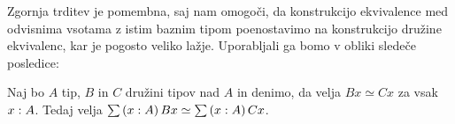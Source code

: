 Zgornja trditev je pomembna, saj nam omogoči, da konstrukcijo ekvivalence med odvisnima
vsotama z istim baznim tipom poenostavimo na konstrukcijo družine ekvivalenc,
kar je pogosto veliko lažje. Uporabljali ga bomo v obliki sledeče posledice:

\begin{posledica}
  \label{equiv-tot}
  Naj bo \(A\) tip, \(B\) in \(C\) družini tipov nad \(A\) in denimo, da velja
  \(Bx \simeq Cx\) za vsak \(x : A\).
  Tedaj velja \(\sum \left( x : A \right) Bx \simeq \sum \left( x : A \right) Cx\).
\end{posledica}

